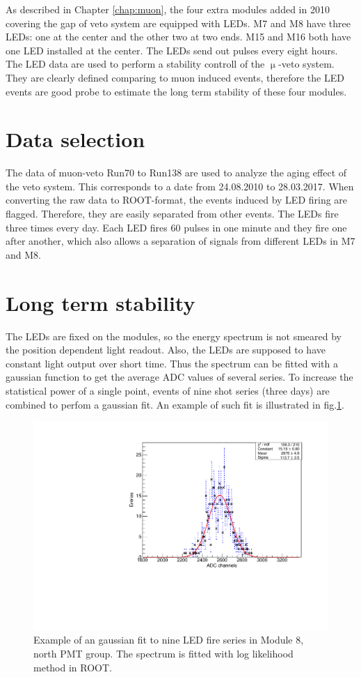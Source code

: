 As described in Chapter \ref{chap:muon}, the four extra modules added in 2010 covering the gap of veto system are equipped with LEDs. M7 and M8 have three LEDs: one at the center and the other two at two ends. M15 and M16 both have one LED installed at the center. The LEDs send out pulses every eight hours. The LED data are used to perform a stability controll of the $\upmu$-veto system. They are clearly defined comparing to muon induced events, therefore the LED events are good probe to estimate the long term stability of these four modules.
\section{Data selection}
The data of muon-veto Run70 to Run138 are used to analyze the aging effect of the veto system. This corresponds to a date from 24.08.2010 to 28.03.2017. When converting the raw data to ROOT-format, the events induced by LED firing are flagged. Therefore, they are easily separated from other events.
The LEDs fire three times every day. Each LED fires 60 pulses in one minute and they fire one after another, which also allows a separation of signals from different LEDs in M7 and M8.



\section{Long term stability}
The LEDs are fixed on the modules, so the energy spectrum is not smeared by the position dependent light readout. Also, the LEDs are supposed to have constant light output over short time. Thus the spectrum can be fitted with a gaussian function to get the average ADC values of several series.
To increase the statistical power of a single point, events of nine shot series (three days) are combined to perfom a gaussian fit. An example of such fit is illustrated in fig.\ref{fig:gaussian-fit}.

\begin{figure}[ht]
  \centering
  \includegraphics[width=0.6\textwidth{}]{./fig/gaussianM8.pdf}
  \caption{Example of an gaussian fit to nine LED fire series in Module 8, north PMT group. The spectrum is fitted with log likelihood method in ROOT.}
  \label{fig:gaussian-fit}
\end{figure}

